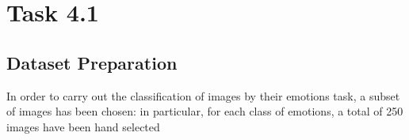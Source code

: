 \section{Task 4.1}
\subsection{Dataset Preparation}
In order to carry out the classification of images by their emotions task, a subset of images has been chosen: in particular, for each class of emotions, a total of 250 images have been hand selected